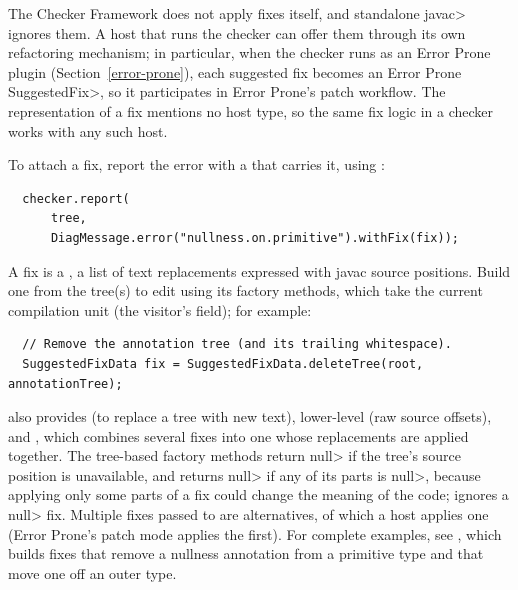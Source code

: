 The Checker Framework does not apply fixes itself, and standalone \<javac> ignores
them.  A host that runs the checker can offer them through its own refactoring
mechanism; in particular, when the checker runs as an Error Prone plugin
(Section~\ref{error-prone}), each suggested fix becomes an Error Prone
\<SuggestedFix>, so it participates in Error Prone's patch workflow.  The
representation of a fix mentions no host type, so the same fix logic in a checker
works with any such host.

To attach a fix, report the error with a
 that carries it, using
:

\begin{Verbatim}
  checker.report(
      tree,
      DiagMessage.error("nullness.on.primitive").withFix(fix));
\end{Verbatim}

A fix is a , a list of text
replacements expressed with javac source positions.  Build one from the tree(s) to
edit using its factory methods, which take the current compilation unit (the
visitor's  field); for example:

\begin{Verbatim}
  // Remove the annotation tree (and its trailing whitespace).
  SuggestedFixData fix = SuggestedFixData.deleteTree(root, annotationTree);
\end{Verbatim}

 also provides  (to
replace a tree with new text), lower-level  (raw source offsets), and
, which combines several fixes into one whose replacements are applied
together.  The tree-based factory methods return \<null> if the tree's source
position is unavailable, and  returns \<null> if any of its parts is
\<null>, because applying only some parts of a fix could change the meaning of the
code;  ignores a \<null> fix.  Multiple fixes passed to
 are alternatives, of which a host applies one (Error Prone's patch
mode applies the first).  For complete examples, see
, which builds fixes that remove
a nullness annotation from a primitive type and that move one off an outer type.



